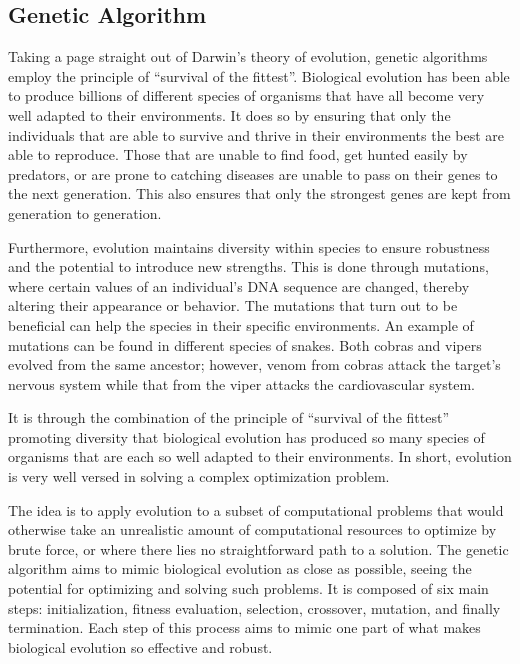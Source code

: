 \documentclass[12pt]{article}
\begin{document}
\subsection{Genetic Algorithm}

Taking a page straight out of Darwin's theory of evolution, genetic algorithms employ the principle of ``survival of the fittest''. Biological evolution has been able to produce billions \autocite{Sweetlove_2011} of different species of organisms that have all become very well adapted to their environments. It does so by ensuring that only the individuals that are able to survive and thrive in their environments the best are able to reproduce. Those that are unable to find food, get hunted easily by predators, or are prone to catching diseases are unable to pass on their genes to the next generation. This also ensures that only the strongest genes are kept from generation to generation.

Furthermore, evolution maintains diversity within species to ensure robustness and the potential to introduce new strengths. This is done through mutations, where certain values of an individual's DNA sequence are changed, thereby altering their appearance or behavior. The mutations that turn out to be beneficial can help the species in their specific environments. An example of mutations can be found in different species of snakes. Both cobras and vipers evolved from the same ancestor; however, venom from cobras attack the target's nervous system while that from the viper attacks the cardiovascular system.

It is through the combination of the principle of ``survival of the fittest'' promoting diversity that biological evolution has produced so many species of organisms that are each so well adapted to their environments. In short, evolution is very well versed in solving a complex optimization problem.

The idea is to apply evolution to a subset of computational problems that would otherwise take an unrealistic amount of computational resources to optimize by brute force, or where there lies no straightforward path to a solution. The genetic algorithm aims to mimic biological evolution as close as possible, seeing the potential for optimizing and solving such problems. It is composed of six main steps: initialization, fitness evaluation, selection, crossover, mutation, and finally termination. Each step of this process aims to mimic one part of what makes biological evolution so effective and robust.
\end{document}
